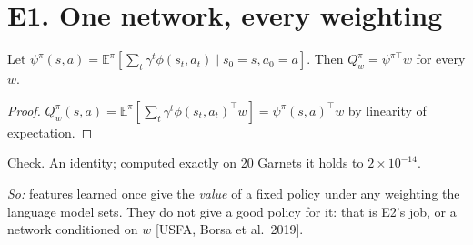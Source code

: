 \section*{E1. One network, every weighting}
\begin{theorem} Let $\psi^\pi(s,a)=\mathbb E^\pi[\sum_t\gamma^t\phi(s_t,a_t)\mid s_0=s,a_0=a]$. Then
$Q^\pi_w=\psi^{\pi\top}w$ for every $w$.\end{theorem}
\begin{proof} $Q^\pi_w(s,a)=\mathbb E^\pi[\sum_t\gamma^t\phi(s_t,a_t)^\top w]=\psi^\pi(s,a)^\top w$ by linearity of
expectation.\end{proof}
\noindent Check. An identity; computed exactly on 20 Garnets it holds to $2\times10^{-14}$.

\emph{So:} features learned once give the \emph{value} of a fixed policy under any weighting the language model sets.
They do not give a good policy for it: that is E2's job, or a network conditioned on $w$ [USFA, Borsa et al.\ 2019].
